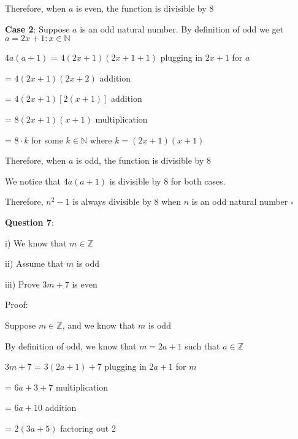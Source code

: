 \documentclass{article} %
\newcommand{\question}[2][]{\begin{flushleft}
        \textbf{Question #1}: \textit{#2}

\end{flushleft}}
\begin{document}

    Therefore, when $a$ is even, the function is divisible by 8

    \vspace*{0.2cm}

    \textbf{Case 2}: Suppose $a$ is an odd natural number. By definition of odd we get $a = 2x + 1; x \in \mathbb{N}$

    $4a(a + 1)$ = $4(2x + 1)(2x + 1+ 1)$ \tabto*{6cm}plugging in $2x + 1$ for $a$

    \tabto*{2.08cm} = $4(2x + 1)(2x + 2)$ \tabto*{6cm}addition

    \tabto*{2.08cm} = $4(2x + 1)[2(x + 1)]$ \tabto*{6cm}addition

    \tabto*{2.08cm} = $8(2x + 1)(x + 1)$ \tabto*{6cm}multiplication

    \tabto*{2.08cm} = $8\cdot k$ for some $k \in \mathbb{N}$ where $k = (2x + 1)(x + 1)$


    Therefore, when $a$ is odd, the function is divisible by 8

    \vspace*{0.3cm}

    We notice that $4a(a+1)$ is divisible by 8 for both cases.

    Therefore, $n^2 -1$ is always divisible by 8 when $n$ is an odd natural number $\square$

    \question[7]{}

    i) We know that $m \in \mathbb{Z}$

    ii) Assume that $m$ is odd

    iii) Prove $3m + 7$ is even

    \vspace*{0.3cm}
    Proof:

    Suppose $m \in \mathbb{Z}$, and we know that $m$ is odd
    
    By definition of odd, we know that $m = 2a+1$ such that $a \in \mathbb{Z}$

    $3m + 7$ = $3(2a + 1) + 7$ \tabto*{5cm}plugging in $2a + 1$ for $m$

    \tabto*{1.75cm} = $6a + 3 + 7$ \tabto*{5cm}multiplication

    \tabto*{1.75cm} = $6a + 10$ \tabto*{5cm}addition

    \tabto*{1.75cm} = $2(3a + 5)$ \tabto*{5cm}factoring out 2
\end{document}
